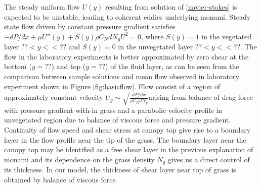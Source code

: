 \documentclass[aps,prl,twocolumn,showpacs,superscriptaddress,groupedaddress,10pt]{revtex4-1}  %
\newcommand{\bu}{\mathbf{u}}
\newcommand{\del}{\partial}
\begin{document}
\newline
The steady uniform flow $U(y)$ resulting from solution of \eqref{navier-stokes} is expected to be unstable, leading to coherent eddies underlying monami. Steady state flow driven by   
constant pressure gradient satisfies
$-{dP}/{dx}+\mu U''(y) +S(y) \rho C_N d N_gU^2=0$, where $S(y)=1$ in the vegetated layer $??<y<<??$ and $S(y)=0$ in the unvegetated layer $?? < y<< ??$. The flow in the laboratory experiments is better approximated by zero shear at the bottom ($y=??$) and top ($y=??$) of the fluid layer, as can be seen from the comparison between sample solutions and mean flow observed in laboratory experiment shown in Figure \ref{fig:basicflow}. Flow consist of a region of approximately constant velocity
\small$U_g \sim \sqrt{\frac{dP/dx}{\rho C_N dN_g}}$\normalsize arising from balance of drag force with pressure gradient with-in grass and a parabolic velocity 
profile in unvegetated region due to balance of viscous force and pressure gradient. Continuity of flow speed and shear stress at canopy top 
give rise to a boundary layer in the flow profile near the tip of the grass. The boundary layer near the canopy top may be identified 
as a free shear layer\cite{Ghisal02} in the previous explanation of monami and its dependence on the grass density $N_g$ gives us a direct control of its thickness. 
In our model, the thickness of shear layer near top of grass is obtained by balance of viscous force 
\end{document}
